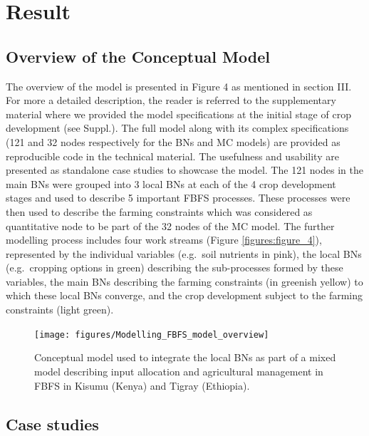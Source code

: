 \documentclass[12pt,oneside]{article}
\begin{document}
\hypertarget{result}{%
\section{Result}\label{result}}

\hypertarget{overview-of-the-conceptual-model}{%
\subsection{Overview of the Conceptual
Model}\label{overview-of-the-conceptual-model}}

The overview of the model is presented in Figure 4 as mentioned in
section III. For more a detailed description, the reader is referred to
the supplementary material where we provided the model specifications at
the initial stage of crop development (see Suppl.). The full model along
with its complex specifications (121 and 32 nodes respectively for the
BNs and MC models) are provided as reproducible code in the technical
material. The usefulness and usability are presented as standalone case
studies to showcase the model. The 121 nodes in the main BNs were
grouped into 3 local BNs at each of the 4 crop development stages and
used to describe 5 important FBFS processes. These processes were then
used to describe the farming constraints which was considered as
quantitative node to be part of the 32 nodes of the MC model. The
further modelling process includes four work streams (Figure
\ref{figures:figure_4}), represented by the individual variables
(e.g.~soil nutrients in pink), the local BNs (e.g.~cropping options in
green) describing the sub-processes formed by these variables, the main
BNs describing the farming constraints (in greenish yellow) to which
these local BNs converge, and the crop development subject to the
farming constraints (light green).

\begin{figure}
\texttt{[image: figures/Modelling\_FBFS\_model\_overview]} \caption{\label{figures:figure_4}Conceptual model used to integrate the local BNs as part of a mixed model describing input allocation and agricultural management in FBFS in Kisumu (Kenya) and Tigray (Ethiopia).}\label{fig:figure_4}
\end{figure}

\hypertarget{case-studies}{%
\subsection{Case studies}\label{case-studies}}
\end{document}
